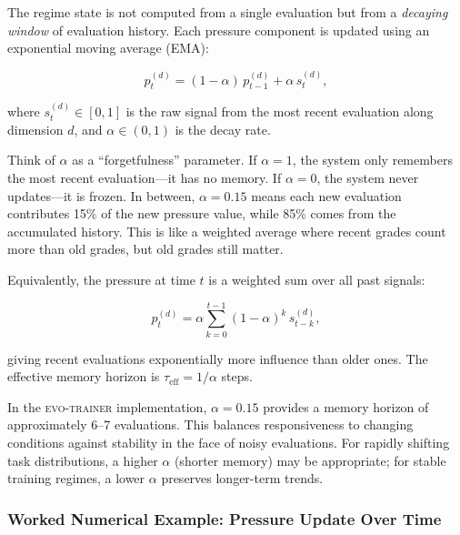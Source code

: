The regime state is not computed from a single evaluation but from a \emph{decaying window} of evaluation history. Each pressure component is updated using an exponential moving average (EMA):

\begin{equation}
p_t^{(d)} = (1 - \alpha)\, p_{t-1}^{(d)} + \alpha\, s_t^{(d)},
\label{eq:pressure-ema}
\end{equation}

where $s_t^{(d)} \in [0,1]$ is the raw signal from the most recent evaluation along dimension $d$, and $\alpha \in (0,1)$ is the decay rate.

\begin{example}
Think of $\alpha$ as a ``forgetfulness'' parameter. If $\alpha = 1$, the system only remembers the most recent evaluation---it has no memory. If $\alpha = 0$, the system never updates---it is frozen. In between, $\alpha = 0.15$ means each new evaluation contributes 15\% of the new pressure value, while 85\% comes from the accumulated history. This is like a weighted average where recent grades count more than old grades, but old grades still matter.
\end{example}

Equivalently, the pressure at time $t$ is a weighted sum over all past signals:

\begin{equation}
p_t^{(d)} = \alpha \sum_{k=0}^{t-1} (1-\alpha)^k\, s_{t-k}^{(d)},
\label{eq:pressure-decay}
\end{equation}

giving recent evaluations exponentially more influence than older ones. The effective memory horizon is $\tau_{\text{eff}} = 1/\alpha$ steps.

\begin{implnote}
In the \textsc{evo-trainer} implementation, $\alpha = 0.15$ provides a memory horizon of approximately 6--7 evaluations. This balances responsiveness to changing conditions against stability in the face of noisy evaluations. For rapidly shifting task distributions, a higher $\alpha$ (shorter memory) may be appropriate; for stable training regimes, a lower $\alpha$ preserves longer-term trends.
\end{implnote}

\subsubsection{Worked Numerical Example: Pressure Update Over Time}

